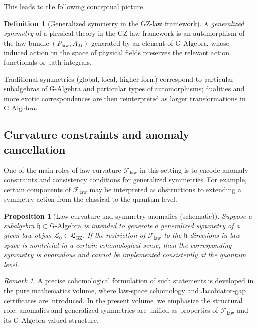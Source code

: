 \documentclass[11pt]{book}
\newcommand{\GAlgebra}{\text{G-Algebra}}
\newcommand{\GZLS}{\ensuremath{\mathfrak{L}_{\mathrm{GZ}}}}
\newcommand{\GZLOC}{\ensuremath{A_M}}
\newcommand{\GZLCurv}{\ensuremath{\mathcal{F}_{\mathrm{law}}}}
\newcommand{\Bundle}{\ensuremath{P}}
\theoremstyle{plain}
\newtheorem{proposition}[theorem]{Proposition}
\theoremstyle{definition}
\newtheorem{definition}[theorem]{Definition}
\theoremstyle{remark}
\newtheorem{remark}[theorem]{Remark}
\begin{document}
This leads to the following conceptual picture.

\begin{definition}[Generalized symmetry in the GZ-law framework]
  A \emph{generalized symmetry} of a physical theory in the GZ-law
  framework is an automorphism of the law-bundle
  $(\Bundle_{\mathrm{law}},\GZLOC)$ generated by an element of
  $\GAlgebra$, whose induced action on the space of physical fields
  preserves the relevant action functionals or path integrals.
\end{definition}

Traditional symmetries (global, local, higher-form) correspond to
particular subalgebras of $\GAlgebra$ and particular types of
automorphisms; dualities and more exotic correspondences are then
reinterpreted as larger transformations in $\GAlgebra$.

\subsection{Curvature constraints and anomaly cancellation}

One of the main roles of law-curvature $\GZLCurv$ in this setting is to
encode anomaly constraints and consistency conditions for generalized
symmetries. For example, certain components of $\GZLCurv$ may be
interpreted as obstructions to extending a symmetry action from the
classical to the quantum level.

\begin{proposition}[Law-curvature and symmetry anomalies (schematic)]
  Suppose a subalgebra $\mathfrak{h} \subset \GAlgebra$ is intended to
  generate a generalized symmetry of a given law-object
  $\mathcal{L}_0 \in \GZLS$. If the restriction of $\GZLCurv$ to the
  $\mathfrak{h}$-directions in law-space is nontrivial in a certain
  cohomological sense, then the corresponding symmetry is anomalous
  and cannot be implemented consistently at the quantum level.
\end{proposition}

\begin{remark}
  A precise cohomological formulation of such statements is developed
  in the pure mathematics volume, where law-space cohomology and
  Jacobiator-gap certificates are introduced. In the present volume,
  we emphasize the structural role: anomalies and generalized
  symmetries are unified as properties of $\GZLCurv$ and its
  $\GAlgebra$-valued structure.
\end{remark}
\end{document}
